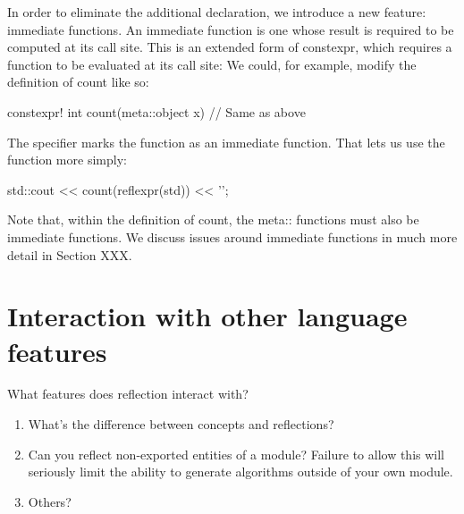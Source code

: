 In order to eliminate the additional declaration, we introduce a new feature: immediate functions. An immediate function is one whose result is required to be computed at its call site. This is an extended form of constexpr, which requires a function to be evaluated at its call site: We could, for example, modify the definition of count like so: 

\begin{codeblock}
constexpr! int count(meta::object x) { 
  // Same as above 
}
\end{codeblock}

The  specifier marks the function as an immediate function. That lets us use the function more simply: 

\begin{codeblock}
std::cout << count(reflexpr(std)) << '\n'; 
\end{codeblock}

Note that, within the definition of count, the meta:: functions must also be immediate functions. We discuss issues around immediate functions in much more detail in Section XXX. 

\section{Interaction with other language features}

What features does reflection interact with?
\begin{enumerate}
\item What's the difference between concepts and reflections?
\item Can you reflect non-exported entities of a module? Failure to allow this will seriously limit the ability to generate algorithms outside of your own module.
\item Others?
\end{enumerate}
